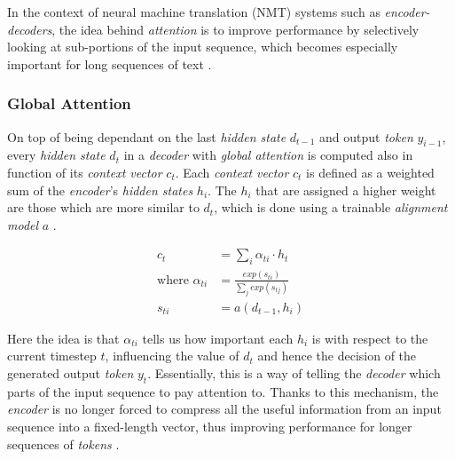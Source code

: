 In the context of neural machine translation (NMT) systems such as \textit{encoder-decoders}, the idea behind \textit{attention} is to improve performance by selectively looking at sub-portions of the input sequence, which becomes especially important for long sequences of text \cite{yao_dual_2018}.

\subsubsection*{Global Attention}

On top of being dependant on the last \textit{hidden state} $d_{t-1}$ and output \textit{token} $y_{i-1}$, every \textit{hidden state} $d_t$ in a \textit{decoder} with \textit{global attention} is computed also in function of its \textit{context vector} $c_t$. Each \textit{context vector} $c_t$ is defined as a weighted sum of the \textit{encoder}'s \textit{hidden states} $h_i$. The $h_i$ that are assigned a higher weight are those which are more similar to $d_t$, which is done using a trainable \textit{alignment model} $a$ \cite{bahdanau_neural_2016}.

\begin{equation}
\begin{aligned}
c_t &= \sum_{i} \alpha_{ti} \cdot h_t \\
\mbox{where } \alpha_{ti} &= \frac{exp(s_{ti})}{\sum_{j} exp(s_{tj})} \\
s_{ti} &= a(d_{t-1},h_i)
\end{aligned}
\end{equation}

Here the idea is that $\alpha_{ti}$ tells us how important each $h_i$ is with respect to the current timestep $t$, influencing the value of $d_t$ and hence the decision of the generated output \textit{token} $y_t$. Essentially, this is a way of telling the \textit{decoder} which parts of the input sequence to pay attention to. Thanks to this mechanism, the \textit{encoder} is no longer forced to compress all the useful information from an input sequence into a fixed-length vector, thus improving performance for longer sequences of \textit{tokens} \cite{bahdanau_neural_2016}.